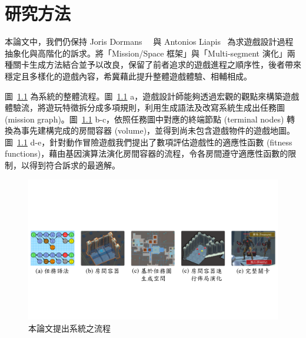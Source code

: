 \newcommand{\missionalphabetnode}[2]{{\texttt{[image: figures/mission-grammars-alphabet/\#1.png]}}}
\newcommand{\missioninstruction}[1]{{\begin{minipage}{.3\textwidth}\texttt{[image: figures/mission-grammars-ins-rep/\#1.png]}\end{minipage}}}

\chapter{研究方法}
\label{cha:methodology}

本論文中，我們仍保持 Joris Dormans~\cite{dormans2010adventures}~\cite{dormans2012engineering} 與 Antonios Liapis~\cite{liapis2013generating} 為求遊戲設計過程抽象化與高階化的訴求。將「Mission/Space 框架」與「Multi-segment 演化」兩種關卡生成方法結合並予以改良，保留了前者追求的遊戲進程之順序性，後者帶來穩定且多樣化的遊戲內容，希冀藉此提升整體遊戲體驗、相輔相成。

圖~\ref{fig:system-framework} 為系統的整體流程。圖~\ref{fig:system-framework} a，遊戲設計師能夠透過宏觀的觀點來構築遊戲體驗流，將遊玩特徵拆分成多項規則，利用生成語法及改寫系統生成出任務圖 (mission graph)。圖~\ref{fig:system-framework} b-c，依照任務圖中對應的終端節點 (terminal nodes) 轉換為事先建構完成的房間容器 (volume)，並得到尚未包含遊戲物件的遊戲地圖。圖~\ref{fig:system-framework} d-e，針對動作冒險遊戲我們提出了數項評估遊戲性的適應性函數 (fitness functions)，藉由基因演算法演化房間容器的流程，令各房間遵守適應性函數的限制，以得到符合訴求的最適解。

\begin{figure}[!htb]
  \begin{center}
    \includegraphics[width=1.0\textwidth]{figures/system-framework.pdf}
    \caption{本論文提出系統之流程} 
    \label{fig:system-framework}
  \end{center}
\end{figure}

